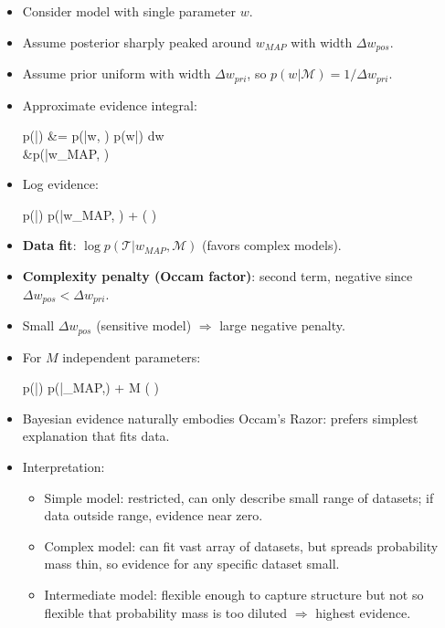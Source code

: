 \begin{itemize}
    \item Consider model with single parameter $w$.
    \item Assume posterior sharply peaked around $w_{MAP}$ with width $\Delta w_{pos}$.
    \item Assume prior uniform with width $\Delta w_{pri}$, so $p(w|\mathcal{M}) = 1/\Delta w_{pri}$.
    \item Approximate evidence integral:
    \begin{myalign}
    p(|) &= \int p(|w, ) p(w|) dw \\
    &\simeq p(|w_{MAP}, ) 
    \end{myalign}
    \item Log evidence:
    \begin{myequation}
    \log p(|) \simeq \log p(|w_{MAP}, ) + \log \left(  \right)
    \end{myequation}
    \item \textbf{Data fit}: $\log p(\mathcal{T}|w_{MAP}, \mathcal{M})$ (favors complex models).
    \item \textbf{Complexity penalty (Occam factor)}: second term, negative since $\Delta w_{pos} < \Delta w_{pri}$.
    \item Small $\Delta w_{pos}$ (sensitive model) $\Rightarrow$ large negative penalty.
    \item For $M$ independent parameters:
    \begin{myequation}
    \log p(|) \simeq \log p(|\w_{MAP},) + M \log \left(  \right)
    \end{myequation}
    \item Bayesian evidence naturally embodies \alert{Occam's Razor}: prefers simplest explanation that fits data.
    \item Interpretation:
    \begin{itemize}
        \item Simple model: restricted, can only describe small range of datasets; if data outside range, evidence near zero.
        \item Complex model: can fit vast array of datasets, but spreads probability mass thin, so evidence for any specific dataset small.
        \item Intermediate model: flexible enough to capture structure but not so flexible that probability mass is too diluted $\Rightarrow$ highest evidence.
    \end{itemize}
\end{itemize}


